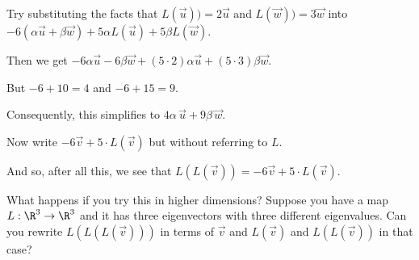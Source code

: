 \documentclass{ximera}
\begin{document}
\begin{question}
\begin{question}
    \begin{hint}
      Try substituting the facts that $L(\vec{u})) = 2 \vec{u}$ and $L(\vec{w})) = 3 \vec{w}$ into $-6 \left( \alpha \vec{u} + \beta \vec{w} \right) + 5 \alpha L(\vec{u}) + 5 \beta L(\vec{w})$.
    \end{hint}    

    \begin{hint}
      Then we get $-6 \alpha \vec{u} - 6 \beta \vec{w} + (5 \cdot 2) \alpha \vec{u} + (5 \cdot 3) \beta \vec{w}$.
    \end{hint}    

    \begin{hint}
      But $-6 + 10 = 4$ and $-6 + 15 = 9$.
    \end{hint}    

    \begin{hint}
      Consequently, this simplifies to $4\alpha\,\vec{u} + 9\beta\,\vec{w}$.
    \end{hint}    

    Now write $-6 \vec{v} + 5 \cdot L(\vec{v})$ but without referring to $L$.
    \begin{multiple-choice}
    \end{multiple-choice} 
  \end{question}

  And so, after all this, we see that $L(L(\vec{v})) = -6 \vec{v} + 5 \cdot L(\vec{v})$.

  What happens if you try this in higher dimensions?  Suppose you have
  a map $L : \R^3 \to \R^3$ and it has three eigenvectors with three
  different eigenvalues.  Can you rewrite $L(L(L(\vec{v})))$ in terms
  of $\vec{v}$ and $L(\vec{v})$ and $L(L(\vec{v}))$ in that case?

\end{question}
\end{document}
